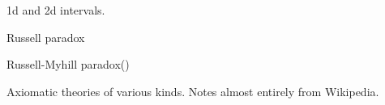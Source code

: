  
1d and 2d intervals.
 
% 
% 
% 
% 
% 
% 
\setcounter{currentlevel}{\value{baseSectionLevel}}
\label{sec:Paradoxes}

Russell paradox~\cite{iep:Russell_paradox}

Russell-Myhill paradox(\cite{iep:Russell_Myhill_paradox})

\setcounter{currentlevel}{\value{baseSectionLevel}}


Axiomatic theories of various kinds.
Notes almost entirely from 
Wikipedia\cite{wiki:Set_theory,iep:Set_theory,eom:Set_theory,sep:Set_theory}.

\label{sec:Cantor_set_theory}

